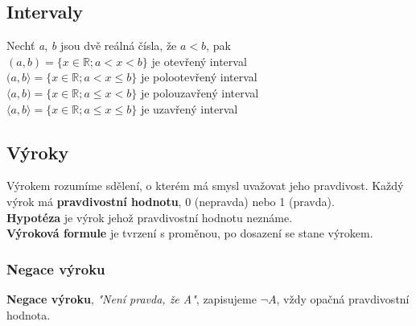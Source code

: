 \documentclass[12pt, a4paper]{article}
\begin{document}
\subsection*{Intervaly}
Nechť \textit{a}, \textit{b} jsou dvě reálná čísla, že $a<b$, pak\\
$(a,b) = \{x \in \mathbb{R}; a < x < b\}$ je otevřený interval\\
$(a,b\rangle = \{x \in \mathbb{R}; a < x \leq b\}$ je polootevřený interval\\
$\langle a,b) = \{x \in \mathbb{R}; a \leq x < b\}$ je polouzavřený interval\\
$\langle a,b \rangle = \{x \in \mathbb{R}; a \leq x \leq b\}$ je uzavřený interval\\

\subsection*{Výroky}
Výrokem rozumíme sdělení, o kterém má smysl uvažovat jeho pravdivost. Každý výrok má \textbf{pravdivostní hodnotu}, 0 (nepravda) nebo 1 (pravda).\\
\textbf{Hypotéza} je výrok jehož pravdivostní hodnotu neznáme. \\
\textbf{Výroková formule} je tvrzení s proměnou, po dosazení se stane výrokem.

\subsubsection*{Negace výroku}
\textbf{Negace výroku}, \textit{"Není pravda, že A"}, zapisujeme $\neg A $, vždy opačná pravdivostní hodnota.
\end{document}
